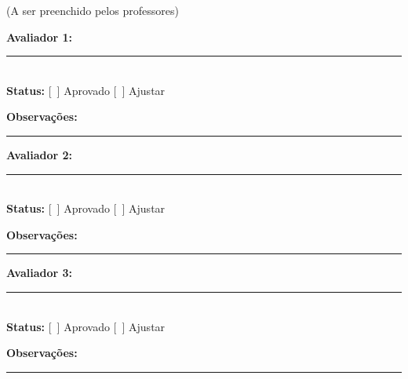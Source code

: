 \documentclass[12pt,a4paper]{article}
\begin{document}
(A ser preenchido pelos professores)

\vspace{0.5cm}
\noindent\textbf{Avaliador 1:} \rule{7cm}{0.4pt} \\
\textbf{Status:} [\ ] Aprovado \hspace{1cm} [\ ] Ajustar

\vspace{0.3cm}
\noindent\textbf{Observações:}

\vspace{1.8cm}
\noindent\rule{\textwidth}{0.4pt}

\vspace{0.5cm}
\noindent\textbf{Avaliador 2:} \rule{7cm}{0.4pt} \\
\textbf{Status:} [\ ] Aprovado \hspace{1cm} [\ ] Ajustar

\vspace{0.3cm}
\noindent\textbf{Observações:}

\vspace{1.8cm}
\noindent\rule{\textwidth}{0.4pt}

\vspace{0.5cm}
\noindent\textbf{Avaliador 3:} \rule{7cm}{0.4pt} \\
\textbf{Status:} [\ ] Aprovado \hspace{1cm} [\ ] Ajustar

\vspace{0.3cm}
\noindent\textbf{Observações:}

\vspace{1.8cm}
\noindent\rule{\textwidth}{0.4pt}
\end{document}
